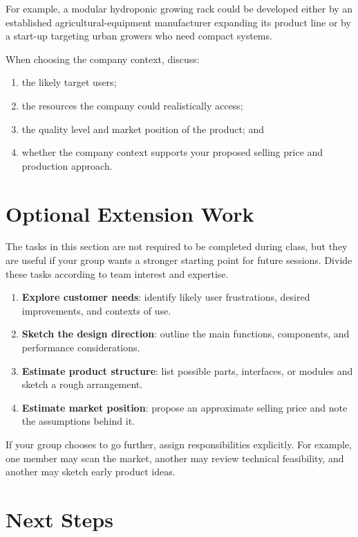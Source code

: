 For example, a modular hydroponic growing rack could be developed either by an established agricultural-equipment manufacturer expanding its product line or by a start-up targeting urban growers who need compact systems.

When choosing the company context, discuss:
\begin{enumerate}
    \item the likely target users;
    \item the resources the company could realistically access;
    \item the quality level and market position of the product; and
    \item whether the company context supports your proposed selling price and production approach.
\end{enumerate}

\section{Optional Extension Work}

The tasks in this section are not required to be completed during class, but they are useful if your group wants a stronger starting point for future sessions. Divide these tasks according to team interest and expertise.

\begin{enumerate}
    \item \textbf{Explore customer needs}: identify likely user frustrations, desired improvements, and contexts of use.
    \item \textbf{Sketch the design direction}: outline the main functions, components, and performance considerations.
    \item \textbf{Estimate product structure}: list possible parts, interfaces, or modules and sketch a rough arrangement.
    \item \textbf{Estimate market position}: propose an approximate selling price and note the assumptions behind it.
\end{enumerate}

If your group chooses to go further, assign responsibilities explicitly. For example, one member may scan the market, another may review technical feasibility, and another may sketch early product ideas.

\section{Next Steps}

